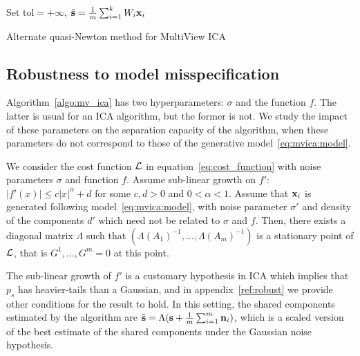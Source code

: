 \documentclass{report}
\begin{document}
{\begin{algorithm}
\SetAlgoLined
{}
Set tol$=+\infty$, $\tilde{\mathbf{s}} = \frac1m\sum_{i=1}^kW_i\mathbf{x}_i$\\
 \caption{Alternate quasi-Newton method for MultiView ICA}
 \label{algo:mv_ica}
\end{algorithm}
%
%
%
%
\subsection{Robustness to model misspecification}
Algorithm~\ref{algo:mv_ica} has two hyperparameters: $\sigma$ and the function $f$.
%
The latter is usual for an ICA algorithm, but the former is not.
%
We study the impact of these parameters on the separation capacity of the algorithm, when these parameters do not correspond to those of the generative model~\eqref{eq:mvica:model}.
%
\begin{proposition}
\label{prop:robust}
We consider the cost function $\mathcal{L}$ in equation~\eqref{eq:cost_function} with noise parameters $\sigma$ and function $f$.
%
Assume sub-linear growth on $f'$: $|f'(x)|\leq c|x|^{\alpha} + d$ for some $c, d > 0$ and $0<\alpha<1$.
%
Assume that $\mathbf{x}_i$ is generated following model~\eqref{eq:mvica:model}, with noise parameter $\sigma'$ and density of the components $d'$ which need not be related to $\sigma$ and $f$.
%
Then, there exists a diagonal matrix $\Lambda$ such that $(\Lambda (A_1)^{-1}, \dots, \Lambda (A_m)^{-1})$ is a stationary point of $\mathcal{L}$, that is $G^1,\dots, G^m =0$ at this point.
\end{proposition}
%
The sub-linear growth of $f'$ is a customary hypothesis in ICA which implies that $p_s$ has heavier-tails than a Gaussian, and in appendix~\ref{ref:robust} we provide other conditions for the result to hold.
%
In this setting, the shared components estimated by the algorithm are $\tilde{\mathbf{s}} = \Lambda (\mathbf{s} + \frac1m \sum_{i=1}^m \mathbf{n}_i)$, which is a scaled version of the best estimate of the shared components under the Gaussian noise hypothesis.

}
\end{document}
